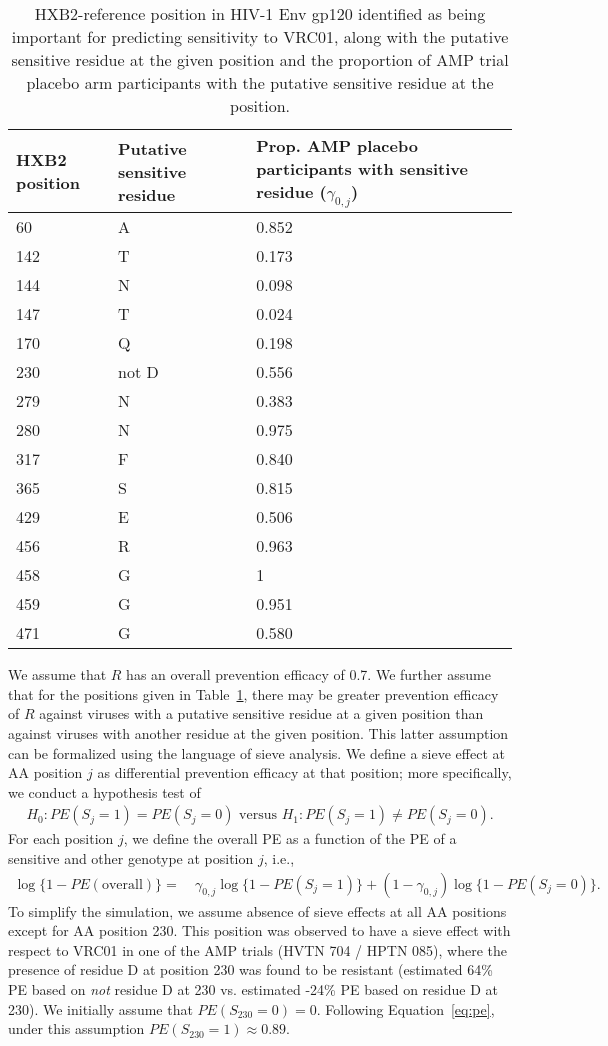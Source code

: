 \documentclass[10pt]{article}
\begin{document}
\begin{table}
  \caption{HXB2-reference position in HIV-1 Env gp120 identified as being important for predicting sensitivity to VRC01, along with the putative sensitive residue at the given position and the proportion of AMP trial placebo arm participants with the putative sensitive residue at the position.}
  \label{tab:sens}
  \begin{tabular}{lll}
    HXB2 position & Putative sensitive residue & Prop. AMP placebo participants with sensitive residue ($\gamma_{0,j}$)\\
    \hline
    60 & A & 0.852 \\
    142 & T & 0.173 \\
    144 & N & 0.098 \\
    147 & T & 0.024 \\
    170 & Q & 0.198 \\
    230 & not D & 0.556 \\
    279 & N & 0.383 \\
    280 & N & 0.975 \\
    317 & F & 0.840 \\
    365 & S & 0.815 \\
    429 & E & 0.506 \\
    456 & R & 0.963 \\
    458 & G & 1 \\
    459 & G & 0.951 \\
    471 & G & 0.580 \\
  \end{tabular}
\end{table}

We assume that $R$ has an overall prevention efficacy of 0.7. We further assume that for the positions given in Table~\ref{tab:sens}, there may be greater prevention efficacy of $R$ against viruses with a putative sensitive residue at a given position than against viruses with another residue at the given position. This latter assumption can be formalized using the language of sieve analysis. We define a sieve effect at AA position $j$ as differential prevention efficacy at that position; more specifically, we conduct a hypothesis test of
\begin{align*}
  H_0: PE(S_j = 1) = PE(S_j = 0) \text{ versus } H_1: PE(S_j = 1) \neq PE(S_j = 0).
\end{align*}
For each position $j$, we define the overall PE as a function of the PE of a sensitive and other genotype at position $j$, i.e.,
\begin{align}
  \log \{1 - PE(\text{overall})\} =& \ \gamma_{0,j} \log \{1 - PE(S_j = 1)\} + (1 - \gamma_{0,j}) \log \{1 - PE(S_j = 0)\}. \label{eq:pe}
\end{align}
To simplify the simulation, we assume absence of sieve effects at all AA positions except for AA position 230. This position was observed to have a sieve effect with respect to VRC01 in one of the AMP trials (HVTN 704 / HPTN 085), where the presence of residue D at position 230 was found to be resistant (estimated 64\% PE based on \emph{not} residue D at 230 vs. estimated -24\% PE based on residue D at 230). We initially assume that $PE(S_{230} = 0) = 0$. Following Equation~\eqref{eq:pe}, under this assumption $PE(S_{230} = 1) \approx 0.89$.
\end{document}
